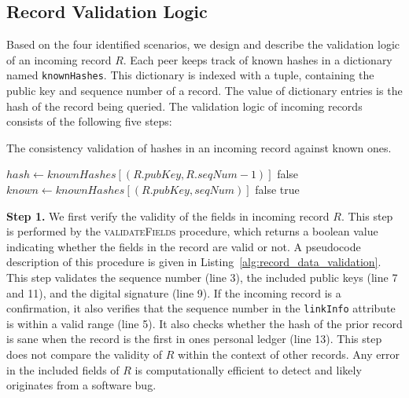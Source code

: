 \subsection{Record Validation Logic}
\label{sec:validation_logic}
Based on the four identified scenarios, we design and describe the validation logic of an incoming record $ R $.
Each peer keeps track of known hashes in a dictionary named \texttt{knownHashes}.
This dictionary is indexed with a tuple, containing the public key and sequence number of a record.
The value of dictionary entries is the hash of the record being queried.
The validation logic of incoming records consists of the following five steps:

\begin{algorithm}[t]
	\caption{The consistency validation of hashes in an incoming record against known ones.}
	\label{alg:record_validation_step4}
	\begin{algorithmic}[1]
		
		  
		\State $ hash \leftarrow knownHashes[(R.pubKey, R.seqNum - 1)] $
		\State \Return false
		\EndIf
		\State
		\State $ known \leftarrow knownHashes[(R.pubKey, seqNum)] $
		\State \Return false
		\EndIf
		\EndFor
		\State \Return true
		\EndProcedure
		
	\end{algorithmic}
\end{algorithm}

\textbf{Step 1.}
We first verify the validity of the fields in incoming record $ R $.
This step is performed by the \textsc{validateFields} procedure, which returns a boolean value indicating whether the fields in the record are valid or not.
A pseudocode description of this procedure is given in Listing~\ref{alg:record_data_validation}.
This step validates the sequence number (line 3), the included public keys (line 7 and 11), and the digital signature (line 9).
If the incoming record is a confirmation, it also verifies that the sequence number in the \texttt{linkInfo} attribute is within a valid range (line 5).
It also checks whether the hash of the prior record is sane when the record is the first in ones personal ledger (line 13).
This step does not compare the validity of $ R $ within the context of other records.
Any error in the included fields of $ R $ is computationally efficient to detect and likely originates from a software bug.

